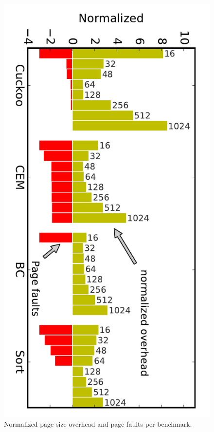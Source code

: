 \begin{figure}
	\centering
	\includegraphics[width=\columnwidth]{figures/pagSizeOverhead}
	\caption{Normalized page size overhead and page faults per benchmark.}
	\label{fig:IPOSPerformance}
	\label{fig:page_size}
\end{figure}

